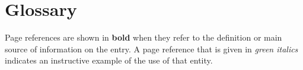 \documentclass[10pt,twoside,english,pdftex]{article}
\begin{document}
\T\markright{}%
\T\pagestyle{plain}
\T\cleardoublepage
\T{}%
\T\markright{}%
\W{}
\T\pagestyle{fancy}
\T\thispagestyle{fancybottom}
\T{}%
\T\global\def\fnlastname{ }%
\T\renewcommand{\headrulewidth}{0pt}
\section*{Glossary}




\T\markright{}%
\T\pagestyle{plain}
\T\cleardoublepage
\W{}
\T\pagestyle{fancy}
\T\thispagestyle{fancybottom}
\T\fancyhead[er,ol]{}
\T\small
\T{}%

\T\twocolumn
%
\texonly{\section*{\indexname}}%
% 
Page references are shown in \textbf{bold} when they refer to the definition
or main source of information on the entry. A page reference that is given in
\textit{\textcolor{verydarkgreen}{green italics}\/} indicates an instructive
example of the use of that entity.
%
\W\\~\\
\T\bigskip
%
\texorhtml{}{\htmlprintindex}

\end{document}
